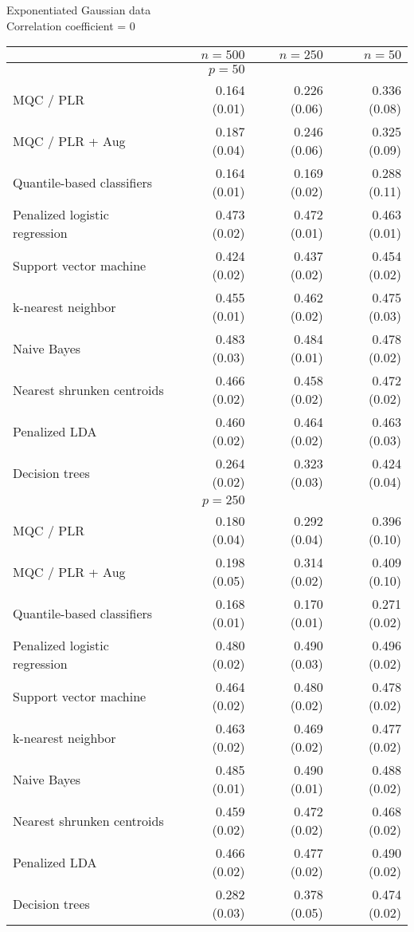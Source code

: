 \begin{table}[p]
  \centering
  Exponentiated Gaussian data \\
  Correlation coefficient = 0 \\[2ex]
  \begin{adjustbox}{max size={\textwidth}{10cm}}
    \begin{tabular}{l@{\extracolsep{15mm}}rrr}
      
      \hline
      & $n=500$ & $n=250$ & $n=50$ \\ 
      \hline
      & $p = 50$ \\
      \hline

      MQC / PLR & 0.164 (0.01) & 0.226 (0.06) & 0.336 (0.08) \\ 
      MQC / PLR + Aug & 0.187 (0.04) & 0.246 (0.06) & 0.325 (0.09) \\ 
      Quantile-based classifiers & 0.164 (0.01) & 0.169 (0.02) & 0.288 (0.11) \\ 
      Penalized logistic regression & 0.473 (0.02) & 0.472 (0.01) & 0.463 (0.01) \\ 
      Support vector machine & 0.424 (0.02) & 0.437 (0.02) & 0.454 (0.02) \\ 
      k-nearest neighbor & 0.455 (0.01) & 0.462 (0.02) & 0.475 (0.03) \\ 
      Naive Bayes & 0.483 (0.03) & 0.484 (0.01) & 0.478 (0.02) \\ 
      Nearest shrunken centroids & 0.466 (0.02) & 0.458 (0.02) & 0.472 (0.02) \\ 
      Penalized LDA & 0.460 (0.02) & 0.464 (0.02) & 0.463 (0.03) \\ 
      Decision trees & 0.264 (0.02) & 0.323 (0.03) & 0.424 (0.04) \\ [2ex]

      \hline
      & $p = 250$ \\
      \hline

      MQC / PLR & 0.180 (0.04) & 0.292 (0.04) & 0.396 (0.10) \\ 
      MQC / PLR + Aug & 0.198 (0.05) & 0.314 (0.02) & 0.409 (0.10) \\ 
      Quantile-based classifiers & 0.168 (0.01) & 0.170 (0.01) & 0.271 (0.02) \\ 
      Penalized logistic regression & 0.480 (0.02) & 0.490 (0.03) & 0.496 (0.02) \\ 
      Support vector machine & 0.464 (0.02) & 0.480 (0.02) & 0.478 (0.02) \\ 
      k-nearest neighbor & 0.463 (0.02) & 0.469 (0.02) & 0.477 (0.02) \\ 
      Naive Bayes & 0.485 (0.01) & 0.490 (0.01) & 0.488 (0.02) \\ 
      Nearest shrunken centroids & 0.459 (0.02) & 0.472 (0.02) & 0.468 (0.02) \\ 
      Penalized LDA & 0.466 (0.02) & 0.477 (0.02) & 0.490 (0.02) \\ 
      Decision trees & 0.282 (0.03) & 0.378 (0.05) & 0.474 (0.02) \\ [2ex]


\end{tabular}
\end{adjustbox}
\end{table}

